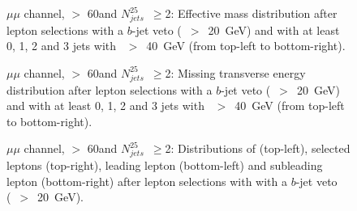 \begin{figure}[h!]
\centering
{}
\caption{$\mu\mu$ channel, \met $>$ 60\GeV and $N_{jets}^{25}$~$\ge$2: Effective mass distribution after lepton selections with a $b$-jet veto (\pt~$>$~20~GeV) and with at least 0, 1, 2 and 3 jets with \pt~$>$~40~GeV (from top-left to bottom-right).}
\label{Fig:VP_mm_0b_Meff}
\end{figure}
\begin{figure}[h!]
\centering
{}
\caption{$\mu\mu$ channel, \met $>$ 60\GeV and $N_{jets}^{25}$~$\ge$2: Missing transverse energy distribution after lepton selections with a $b$-jet veto (\pt~$>$~20~GeV) and with at least 0, 1, 2 and 3 jets with \pt~$>$~40~GeV (from top-left to bottom-right).}
\label{Fig:VP_mm_0b_Met}
\end{figure}
\begin{figure}[h!]
\centering
{}
\caption{$\mu\mu$ channel, \met $>$ 60\GeV and $N_{jets}^{25}$~$\ge$2: Distributions of \mt (top-left), selected leptons \pt (top-right), leading lepton \pt (bottom-left) and subleading lepton \pt (bottom-right) after lepton selections with with a $b$-jet veto (\pt~$>$~20~GeV).}
\label{Fig:VP_mm_0b_Njets_and_other}
\end{figure} 


